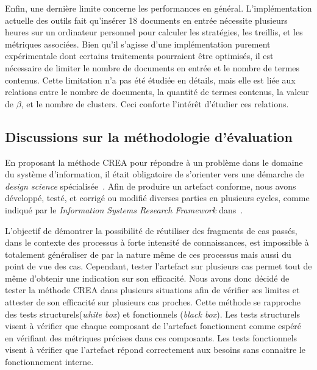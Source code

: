 \bigskip

Enfin, une dernière limite concerne les performances en général.
L'implémentation actuelle des outils fait qu'insérer 18 documents en entrée nécessite plusieurs heures sur un ordinateur personnel pour calculer les stratégies, les treillis, et les métriques associées.
Bien qu'il s'agisse d'une implémentation purement expérimentale dont certains traitements pourraient être optimisés, il est nécessaire de limiter le nombre de documents en entrée et le nombre de termes contenus.
Cette limitation n'a pas été étudiée en détails, mais elle est liée aux relations entre le nombre de documents, la quantité de termes contenus, la valeur de $ \beta $, et le nombre de clusters.
Ceci conforte l'intérêt d'étudier ces relations.

\bigskip



\subsection{Discussions sur la méthodologie d'évaluation}
\label{subsection:Evaluation:Discussions:DiscussionsMethodeEvaluation}

En proposant la méthode CREA pour répondre à un problème dans le domaine du système d'information, il était obligatoire de s'orienter vers une démarche de \textit{design science} spécialisée~\cite{hevner2004design}\cite{peffers2007design}.
Afin de produire un artefact conforme, nous avons développé, testé, et corrigé ou modifié diverses parties en plusieurs cycles, comme indiqué par le \og \textit{Information Systems Research Framework} \fg dans~\cite{hevner2004design}.

\bigskip

L'objectif de démontrer la possibilité de réutiliser des fragments de cas passés, dans le contexte des processus à forte intensité de connaissances, est impossible à totalement généraliser de par la nature même de ces processus mais aussi du point de vue des cas.
Cependant, tester l'artefact sur plusieurs cas permet tout de même d'obtenir une indication sur son efficacité.
Nous avons donc décidé de tester la méthode CREA dans plusieurs situations afin de vérifier ses limites et attester de son efficacité sur plusieurs cas proches.
Cette méthode se rapproche des tests structurels(\textit{white box}) et fonctionnels (\textit{black box}).
Les tests structurels visent à vérifier que chaque composant de l'artefact fonctionnent comme espéré en vérifiant des métriques précises dans ces composants.
Les tests fonctionnels visent à vérifier que l'artefact répond correctement aux besoins sans connaitre le fonctionnement interne.

